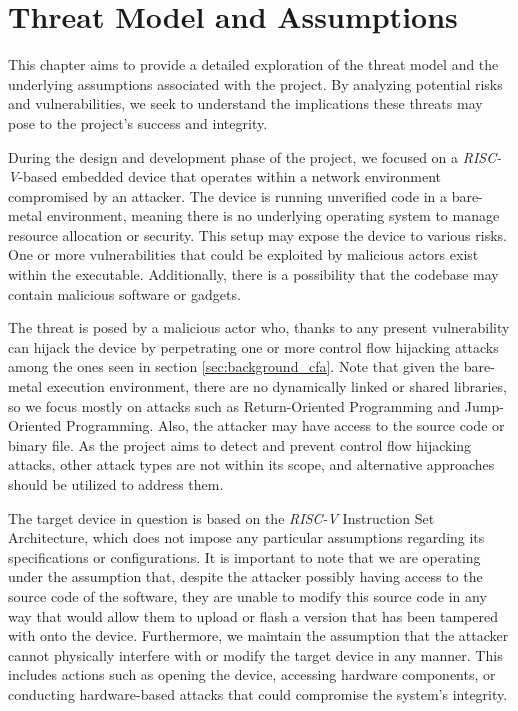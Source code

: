 \chapter{Threat Model and Assumptions}
\label{cha:threatmodel}

This chapter aims to provide a detailed exploration of the threat model and the
underlying assumptions associated with the project. By analyzing potential risks
and vulnerabilities, we seek to understand the implications these threats may
pose to the project's success and integrity.

During the design and development phase of the project, we focused on a \textit{RISC-V}-based
embedded device that operates within a network environment compromised by an
attacker. The device is running unverified code in a bare-metal environment,
meaning there is no underlying operating system to manage resource allocation or
security. This setup may expose the device to various risks. One or more
vulnerabilities that could be exploited by malicious actors exist within the
executable. Additionally, there is a possibility that the codebase may contain
malicious software or gadgets.

The threat is posed by a malicious actor who, thanks to any present vulnerability
can hijack the device by perpetrating one or more control flow hijacking attacks
among the ones seen in section \ref{sec:background_cfa}. Note that given the
bare-metal execution environment, there are no dynamically linked or shared libraries,
so we focus mostly on attacks such as Return-Oriented Programming and Jump-Oriented
Programming. Also, the attacker may have access to the source code or binary
file. As the project aims to detect and prevent control flow hijacking attacks,
other attack types are not within its scope, and alternative approaches should be
utilized to address them.

The target device in question is based on the \textit{RISC-V} Instruction Set
Architecture, which does not impose any particular assumptions regarding its specifications
or configurations. It is important to note that we are operating under the
assumption that, despite the attacker possibly having access to the source code of
the software, they are unable to modify this source code in any way that would
allow them to upload or flash a version that has been tampered with onto the
device. Furthermore, we maintain the assumption that the attacker cannot
physically interfere with or modify the target device in any manner. This includes
actions such as opening the device, accessing hardware components, or conducting
hardware-based attacks that could compromise the system's integrity.
